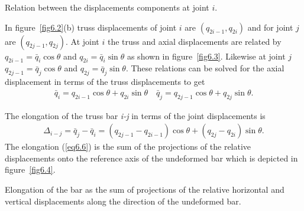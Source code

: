 \documentclass{AeroStructure-ERJohnson}
\begin{document}
{\caption{Relation between the displacements components at joint $i$.}\label{fig6.3}}

In figure~\ref{fig6.2}(b) truss displacements of joint $i$ are $\left(q_{2 i-1}, q_{2 i}\right)$ and for joint $j$ are $\left(q_{2 j-1}, q_{2 j}\right)$. At joint $i$ the truss and axial displacements are related by $q_{2 i-1}=\bar{q}_{i} \cos \theta$ and $q_{2 i}=\bar{q}_{i} \sin \theta$ as shown in figure~\ref{fig6.3}. Likewise at joint $j$ $q_{2 j-1}=\bar{q}_{j} \cos \theta$ and $q_{2 j}=\bar{q}_{j} \sin \theta$. These relations can be solved for the axial displacement in terms of the truss displacements to get
\begin{align}\label{eq6.5}
\bar{q}_{i}=q_{2 i-1} \cos \theta+q_{2 i} \sin \theta \quad \bar{q}_{j}=q_{2 j-1} \cos \theta+q_{2 j} \sin \theta.
\end{align}

\pagebreak

\noindent The elongation of the truss bar \textit{i-j} in terms of the joint displacements is
\begin{align}\label{eq6.6}
\Delta_{i-j}=\bar{q}_{j}-\bar{q}_{i}=\left(q_{2 j-1}-q_{2 i-1}\right) \cos \theta+\left(q_{2 j}-q_{2 i}\right) \sin \theta.
\end{align}
The elongation (\ref{eq6.6}) is the sum of the projections of the relative displacements onto the reference axis of the undeformed bar which is depicted in figure~\ref{fig6.4}.

{\caption{Elongation of the bar as the sum of projections of the relative horizontal and vertical displacements along the direction of the undeformed bar.}\label{fig6.4}}
\end{document}
